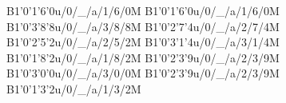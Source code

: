 B1'0'1'6'0u/0/_/a/1/6/0M
B1'0'1'6'0u/0/_/a/1/6/0M
B1'0'3'8'8u/0/_/a/3/8/8M
B1'0'2'7'4u/0/_/a/2/7/4M
B1'0'2'5'2u/0/_/a/2/5/2M
B1'0'3'1'4u/0/_/a/3/1/4M
B1'0'1'8'2u/0/_/a/1/8/2M
B1'0'2'3'9u/0/_/a/2/3/9M
B1'0'3'0'0u/0/_/a/3/0/0M
B1'0'2'3'9u/0/_/a/2/3/9M
B1'0'1'3'2u/0/_/a/1/3/2M
